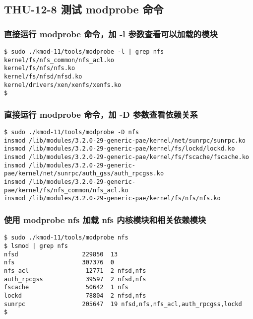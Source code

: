 \documentclass[11pt,a4paper]{article}
\begin{document}
\subsection{THU-12-8 测试 modprobe 命令}

\subsubsection{直接运行 modprobe 命令，加 -l 参数查看可以加载的模块}

{\begin{shaded}\begin{verbatim}
$ sudo ./kmod-11/tools/modprobe -l | grep nfs
kernel/fs/nfs_common/nfs_acl.ko
kernel/fs/nfs/nfs.ko
kernel/fs/nfsd/nfsd.ko
kernel/drivers/xen/xenfs/xenfs.ko
$ 
\end{verbatim}\end{shaded}}
\subsubsection{直接运行 modprobe 命令，加 -D 参数查看依赖关系}

{\begin{shaded}\begin{verbatim}
$ sudo ./kmod-11/tools/modprobe -D nfs
insmod /lib/modules/3.2.0-29-generic-pae/kernel/net/sunrpc/sunrpc.ko 
insmod /lib/modules/3.2.0-29-generic-pae/kernel/fs/lockd/lockd.ko 
insmod /lib/modules/3.2.0-29-generic-pae/kernel/fs/fscache/fscache.ko 
insmod /lib/modules/3.2.0-29-generic-pae/kernel/net/sunrpc/auth_gss/auth_rpcgss.ko 
insmod /lib/modules/3.2.0-29-generic-pae/kernel/fs/nfs_common/nfs_acl.ko 
insmod /lib/modules/3.2.0-29-generic-pae/kernel/fs/nfs/nfs.ko 
\end{verbatim}\end{shaded}}
\subsubsection{使用 modprobe nfs 加载 nfs 内核模块和相关依赖模块}

{\begin{shaded}\begin{verbatim}
$ sudo ./kmod-11/tools/modprobe nfs
$ lsmod | grep nfs
nfsd                  229850  13 
nfs                   307376  0 
nfs_acl                12771  2 nfsd,nfs
auth_rpcgss            39597  2 nfsd,nfs
fscache                50642  1 nfs
lockd                  78804  2 nfsd,nfs
sunrpc                205647  19 nfsd,nfs,nfs_acl,auth_rpcgss,lockd
$ 
\end{verbatim}\end{shaded}}
\end{document}
